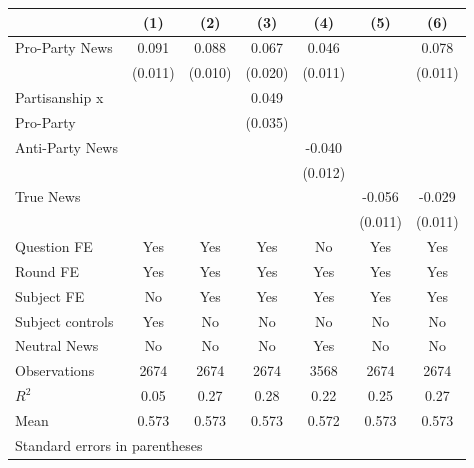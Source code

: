\begin{tabular}{l*{6}{c}}
\hline\hline
                    &\multicolumn{1}{c}{(1)}&\multicolumn{1}{c}{(2)}&\multicolumn{1}{c}{(3)}&\multicolumn{1}{c}{(4)}&\multicolumn{1}{c}{(5)}&\multicolumn{1}{c}{(6)}\\
\hline
Pro-Party News      &    0.091&    0.088&    0.067&    0.046&         &    0.078\\
                    &  (0.011)&  (0.010)&  (0.020)&  (0.011)&         &  (0.011)\\
Partisanship x      &         &         &    0.049&         &         &         \\
Pro-Party           &         &         &  (0.035)&         &         &         \\
Anti-Party News     &         &         &         &   -0.040&         &         \\
                    &         &         &         &  (0.012)&         &         \\
True News           &         &         &         &         &   -0.056&   -0.029\\
                    &         &         &         &         &  (0.011)&  (0.011)\\
Question FE         &      Yes&      Yes&      Yes&       No&      Yes&      Yes\\
Round FE            &      Yes&      Yes&      Yes&      Yes&      Yes&      Yes\\
Subject FE          &       No&      Yes&      Yes&      Yes&      Yes&      Yes\\
Subject controls    &      Yes&       No&       No&       No&       No&       No\\
Neutral News        &       No&       No&       No&      Yes&       No&       No\\
\hline
Observations        &     2674&     2674&     2674&     3568&     2674&     2674\\
\(R^{2}\)           &     0.05&     0.27&     0.28&     0.22&     0.25&     0.27\\
Mean                &    0.573&    0.573&    0.573&    0.572&    0.573&    0.573\\
\hline\hline
\multicolumn{7}{l}{\footnotesize Standard errors in parentheses}\\
\end{tabular}
